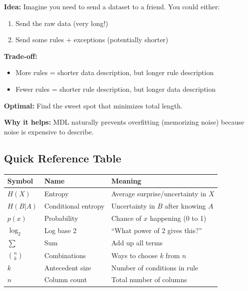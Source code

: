 \documentclass[11pt,a4paper]{article}
\begin{document}
\textbf{Idea:} Imagine you need to send a dataset to a friend. You could either:
\begin{enumerate}
    \item Send the raw data (very long!)
    \item Send some rules + exceptions (potentially shorter)
\end{enumerate}

\textbf{Trade-off:}
\begin{itemize}
    \item More rules = shorter data description, but longer rule description
    \item Fewer rules = shorter rule description, but longer data description
\end{itemize}

\textbf{Optimal:} Find the sweet spot that minimizes total length.

\textbf{Why it helps:} MDL naturally prevents overfitting (memorizing noise) because noise is expensive to describe.

\subsection*{Quick Reference Table}
\label{quick_ref}

\begin{table}[h]
\centering
\small
\begin{tabular}{@{}llp{6cm}@{}}
\toprule
\textbf{Symbol} & \textbf{Name} & \textbf{Meaning} \\
\midrule
$H(X)$ & Entropy & Average surprise/uncertainty in $X$ \\
$H(B|A)$ & Conditional entropy & Uncertainty in $B$ after knowing $A$ \\
$p(x)$ & Probability & Chance of $x$ happening (0 to 1) \\
$\log_2$ & Log base 2 & ``What power of 2 gives this?'' \\
$\sum$ & Sum & Add up all terms \\
$\binom{n}{k}$ & Combinations & Ways to choose $k$ from $n$ \\
$k$ & Antecedent size & Number of conditions in rule \\
$n$ & Column count & Total number of columns \\
\bottomrule
\end{tabular}
\end{table}
\end{document}
